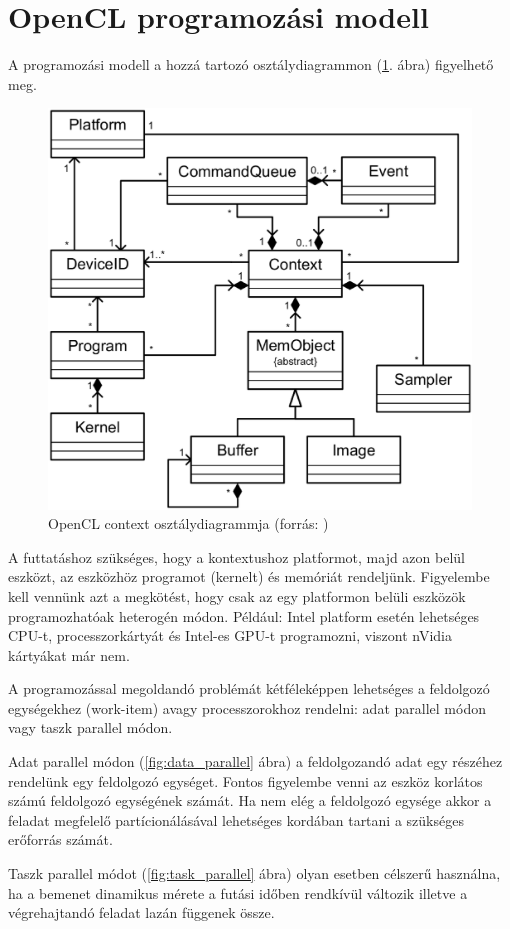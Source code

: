 	
\section{OpenCL programozási modell}
	
	A programozási modell a hozzá tartozó osztálydiagrammon (\ref{fig:class}. ábra) figyelhető meg.
	
	\begin{figure}[!ht]
		\centering
		\includegraphics[width=0.6\columnwidth]{figures/eps/context.eps}
		\caption{OpenCL context osztálydiagrammja (forrás: \cite{opencl})} 
		\label{fig:class} 
	\end{figure}
	A futtatáshoz szükséges, hogy a kontextushoz platformot, majd azon belül
	eszközt, az eszközhöz programot (kernelt) és memóriát rendeljünk.
	Figyelembe kell vennünk azt a megkötést, hogy csak az egy platformon belüli
	eszközök programozhatóak heterogén módon. Például: Intel platform esetén
	lehetséges CPU-t, processzorkártyát és Intel-es GPU-t programozni, viszont nVidia kártyákat már nem.
	
	A programozással megoldandó problémát kétféleképpen lehetséges a feldolgozó
	egységekhez (work-item) avagy processzorokhoz rendelni:
	adat parallel módon vagy taszk parallel módon.
	
	Adat parallel módon (\ref{fig:data_parallel} ábra) a feldolgozandó adat egy
	részéhez rendelünk egy feldolgozó egységet. Fontos figyelembe venni az eszköz korlátos
	számú feldolgozó egységének számát. Ha nem elég a feldolgozó egysége akkor a
	feladat megfelelő partícionálásával lehetséges kordában tartani a szükséges
	erőforrás számát.
	
	Taszk parallel módot (\ref{fig:task_parallel} ábra) olyan esetben célszerű
	használna, ha a bemenet dinamikus mérete a futási időben rendkívül változik
	illetve a végrehajtandó feladat lazán függenek össze.
	

